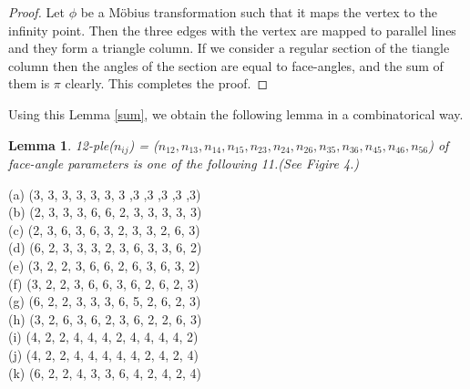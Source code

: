 \documentclass[dvipdfmx]{interact}
\theoremstyle{plain}%
\newtheorem{lemma}[theorem]{Lemma}
\theoremstyle{definition}
\theoremstyle{remark}
\theoremstyle{problemstyle}
\begin{document}
\begin{proof}
 Let $\phi$ be a M\"obius transformation such that it maps the vertex to
 the infinity point. Then the three edges with the vertex are mapped to
 parallel lines and they form a triangle column. If we consider a
 regular section of the tiangle column then the angles of the section
 are equal to face-angles, and the sum of them is $\pi$ clearly. This
 completes the proof.
\end{proof}

 Using this Lemma \ref{sum}, we obtain the following lemma in a combinatorical way.

\begin{lemma}\label{combination}
 12-ple($n_{ij}$) = ($n_{12}, n_{13}, n_{14}, n_{15}, n_{23}, n_{24},
 n_{26}, n_{35}, n_{36}, n_{45}, n_{46}, n_{56}$) of face-angle
 parameters is one of the following 11.(See Figire 4.)
\end{lemma}

\noindent
(a) (3, 3, 3, 3, 3, 3, 3 ,3 ,3 ,3 ,3 ,3)\\
(b) (2, 3, 3, 3, 6, 6, 2, 3, 3, 3, 3, 3)\\
(c) (2, 3, 6, 3, 6, 3, 2, 3, 3, 2, 6, 3)\\
(d) (6, 2, 3, 3, 3, 2, 3, 6, 3, 3, 6, 2)\\
(e) (3, 2, 2, 3, 6, 6, 2, 6, 3, 6, 3, 2)\\
(f) (3, 2, 2, 3, 6, 6, 3, 6, 2, 6, 2, 3)\\
(g) (6, 2, 2, 3, 3, 3, 6, 5, 2, 6, 2, 3)\\
(h) (3, 2, 6, 3, 6, 2, 3, 6, 2, 2, 6, 3)\\
(i) (4, 2, 2, 4, 4, 4, 2, 4, 4, 4, 4, 2)\\
(j) (4, 2, 2, 4, 4, 4, 4, 4, 2, 4, 2, 4)\\
(k) (6, 2, 2, 4, 3, 3, 6, 4, 2, 4, 2, 4)\\
\end{document}

